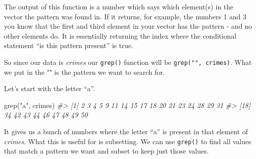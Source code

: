 \documentclass[
]{krantz}
\makeatletter
\newenvironment{Shaded}{\begin{snugshade}}{\end{snugshade}}
\newcommand{\CommentTok}[1]{\textcolor[rgb]{0.37,0.37,0.37}{\textit{#1}}}
\newcommand{\FunctionTok}[1]{\textcolor[rgb]{0,0,0}{#1}}
\newcommand{\NormalTok}[1]{#1}
\newcommand{\StringTok}[1]{\textcolor[rgb]{0.5,0.5,0.5}{#1}}
\newenvironment{kframe}{%
\medskip{}
\setlength{\fboxsep}{.8em}
 \def\at@end@of@kframe{}%
 \ifinner\ifhmode%
  \def\at@end@of@kframe{\end{minipage}}%
  \begin{minipage}{\columnwidth}%
 \fi\fi%
 \def\FrameCommand##1{\hskip\@totalleftmargin \hskip-\fboxsep
 \colorbox{shadecolor}{##1}\hskip-\fboxsep
     \hskip-\linewidth \hskip-\@totalleftmargin \hskip\columnwidth}%
 \MakeFramed {\advance\hsize-\width
   \@totalleftmargin\z@ \linewidth\hsize
   \@setminipage}}%
 {\par\unskip\endMakeFramed%
 \at@end@of@kframe}
\renewenvironment{Shaded}{\begin{kframe}}{\end{kframe}}
\makeatother
\begin{document}
The output of this function is a number which says which element(s) in the vector the pattern was found in. If it returns, for example, the numbers 1 and 3 you know that the first and third element in your vector has the pattern - and no other elements do. It is essentially returning the index where the conditional statement ``is this pattern present'' is true.

So since our data is \emph{crimes} our \texttt{grep()} function will be \texttt{grep("",\ crimes)}. What we put in the "" is the pattern we want to search for.

Let's start with the letter ``a''.

\begin{Shaded}
\begin{Highlighting}[]
\FunctionTok{grep}\NormalTok{(}\StringTok{"a"}\NormalTok{, crimes)}
\CommentTok{\#\textgreater{}  [1]  2  3  4  5  9 11 14 15 17 18 20 21 23 24 28 29 31}
\CommentTok{\#\textgreater{} [18] 34 42 43 44 46 47 48 49 50}
\end{Highlighting}
\end{Shaded}

It gives us a bunch of numbers where the letter ``a'' is present in that element of \emph{crimes}. What this is useful for is subsetting. We can use \texttt{grep()} to find all values that match a pattern we want and subset to keep just those values.
\end{document}
